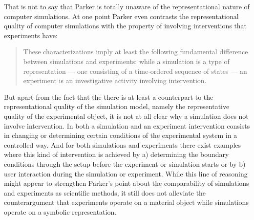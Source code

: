 \documentclass[12pt, a4paper]{article}
\numberwithin{equation}{section}
\begin{document}
That is not to say that Parker is totally unaware of the representational nature of computer simulations. At one point Parker even contrasts the representational quality of computer simulations with the property of involving interventions that experiments have: 

\begin{quotation}
These characterizations imply at least the following fundamental difference between simulations and experiments: while a simulation is a type of representation — one consisting of a time-ordered sequence of states — an experiment is an investigative activity involving intervention. \citep[p.\ 487]{parker:2009}
\end{quotation}

But apart from the fact that the there is at least a counterpart to the representational quality of the simulation model, namely the representative quality of the experimental object, it is not at all clear why a simulation does not involve intervention. In both a simulation and an experiment intervention consists in changing or determining certain conditions of the experimental system in a controlled way. And for both simulations and experiments there exist examples where this kind of intervention is achieved by a) determining the boundary conditions through the setup before the experiment or simulation starts or by b) user interaction during the simulation or experiment. While this line of reasoning might appear to strengthen Parker's point about the comparability of simulations and experiments as scientific methods, it still does not alleviate the counterargument that experiments operate on a material object while simulations operate on a symbolic representation. 
\end{document}

